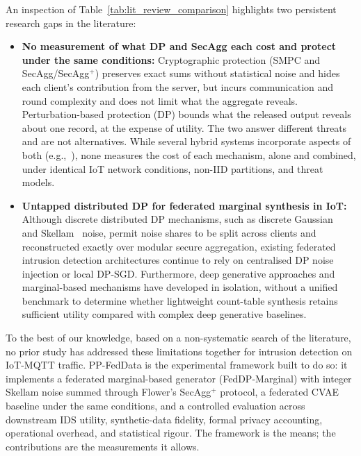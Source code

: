 An inspection of Table~\ref{tab:lit_review_comparison} highlights two persistent research gaps in the literature:
\begin{itemize}
    \item \textbf{No measurement of what DP and SecAgg each cost and protect under the same conditions:} Cryptographic protection (SMPC and SecAgg/SecAgg$^+$) preserves exact sums without statistical noise and hides each client's contribution from the server, but incurs communication and round complexity and does not limit what the aggregate reveals. Perturbation-based protection (DP) bounds what the released output reveals about one record, at the expense of utility. The two answer different threats and are not alternatives. While several hybrid systems incorporate aspects of both (e.g.,~\cite{gutti2024, yao2024, maddock2024}), none measures the cost of each mechanism, alone and combined, under identical IoT network conditions, non-IID partitions, and threat models.
    \item \textbf{Untapped distributed DP for federated marginal synthesis in IoT:} Although discrete distributed DP mechanisms, such as discrete Gaussian~\cite{kairouz2021} and Skellam~\cite{agarwal2021} noise, permit noise shares to be split across clients and reconstructed exactly over modular secure aggregation, existing federated intrusion detection architectures continue to rely on centralised DP noise injection or local DP-SGD. Furthermore, deep generative approaches and marginal-based mechanisms have developed in isolation, without a unified benchmark to determine whether lightweight count-table synthesis retains sufficient utility compared with complex deep generative baselines.
\end{itemize}

To the best of our knowledge, based on a non-systematic search of the literature, no prior study has addressed these limitations together for intrusion detection on IoT-MQTT traffic. PP-FedData is the experimental framework built to do so: it implements a federated marginal-based generator (FedDP-Marginal) with integer Skellam noise summed through Flower's SecAgg$^+$ protocol, a federated CVAE baseline under the same conditions, and a controlled evaluation across downstream IDS utility, synthetic-data fidelity, formal privacy accounting, operational overhead, and statistical rigour. The framework is the means; the contributions are the measurements it allows.

